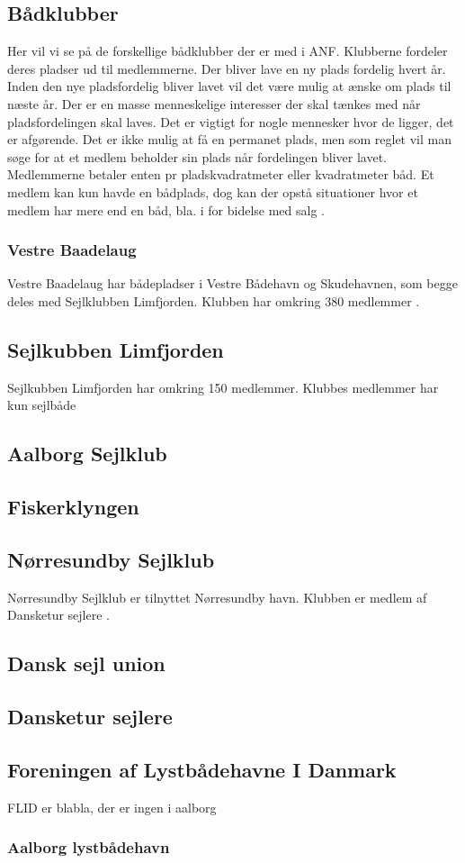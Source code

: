 \subsection{Bådklubber}
Her vil vi se på de forskellige bådklubber der er med i ANF. Klubberne fordeler deres pladser ud til medlemmerne. Der bliver lave en ny plads fordelig hvert år. Inden den nye pladsfordelig bliver lavet vil det være mulig at ænske om plads til næste år. Der er en masse menneskelige interesser der skal tænkes med når pladsfordelingen skal laves. Det er vigtigt for nogle mennesker hvor de ligger, det er afgørende. Det er ikke mulig at få en permanet plads, men som reglet vil man søge for at et medlem beholder sin plads når fordelingen bliver lavet. Medlemmerne betaler enten pr pladskvadratmeter eller kvadratmeter båd. Et medlem kan kun havde en bådplads, dog kan der opstå situationer hvor et medlem har mere end en båd, bla. i for bidelse med salg \cite{int_vb_sl}.

\subsubsection{Vestre Baadelaug}
Vestre Baadelaug har bådepladser i Vestre Bådehavn og Skudehavnen, som begge deles med Sejlklubben Limfjorden. Klubben har omkring 380 medlemmer \cite{int_vb_sl}. 

\subsection{Sejlkubben Limfjorden}
Sejlkubben Limfjorden har omkring 150 medlemmer. Klubbes medlemmer har kun sejlbåde

\subsection{Aalborg Sejlklub}
\subsection{Fiskerklyngen}
\subsection{Nørresundby Sejlklub}
Nørresundby Sejlklub er tilnyttet Nørresundby havn. Klubben er medlem af Dansketur sejlere \cite{norresundby_sejlklub}.

\subsection{Dansk sejl union}

\subsection{Dansketur sejlere}

\subsection{Foreningen af Lystbådehavne I Danmark}
FLID er blabla, der er ingen i aalborg

\subsubsection{Aalborg lystbådehavn}